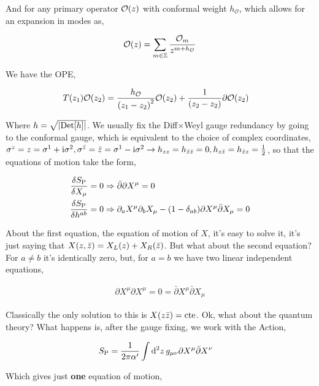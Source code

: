 And for any primary operator $\mathcal O\qty(z)$ with conformal weight $h_{\mathcal O}$, which allows for an expansion 
in modes as, 

\begin{align*}
    \mathcal O\qty(z)=\sum\limits_{m\in\mathbb Z}\frac{\mathcal O_m}{z^{m+h_{\mathcal O}}}
\end{align*}

We have the OPE,

\begin{align*}
    T\qty(z_1)\mathcal O\qty(z_2)&=\frac{h_{\mathcal O}}{\qty(z_1-z_2)^2}\mathcal O\qty(z_2)+\frac{1}{\qty(z_2-z_2)}\partial \mathcal O\qty(z_2)
\end{align*}

Where $h=\sqrt{\abs{\textup{Det} [h]}}$. We usually fix the Diff$\times$Weyl gauge redundancy by going to the conformal gauge, 
which is equivalent to the choice of complex coordinates, $\sigma^z=z=\sigma^1+\textnormal{i}\sigma^2,\sigma^{\bar z}=\bar z=\sigma^1-\textnormal{i}\sigma^2\rightarrow h_{zz}=h_{\bar z\bar z}=0, h_{z\bar z}=h_{\bar zz}=\frac12$, 
so that the equations of motion take the form,

\begin{align*}
    \fdv{S_{\textnormal P}}{X_\mu}&=0\Rightarrow \bar\partial\partial X^\mu=0\\
    \fdv{S_{\textnormal P}}{h^{ab}}&=0\Rightarrow \partial_aX^\mu\partial_bX_\mu-\qty(1-\delta_{ab})\partial X^\mu\bar\partial X_\mu=0
\end{align*}

About the first equation, the equation of motion of $X$, it's easy to solve it, it's just saying that $X\qty(z,\bar z)=X_L\qty(z)+X_R\qty(\bar z)$. 
But what about the second equation? For $a\neq b$ it's identically zero, but, for $a=b$ we have two linear independent equations,

\begin{align*}
    \partial X^\mu\partial X^\mu=0=\bar\partial X^\mu\bar\partial X_\mu
\end{align*}

Classically the only solution to this is $X\qty(z\bar z)=\textnormal{cte}$. Ok, what about the quantum theory? What happens is, after 
the gauge fixing, we work with the Action,

\begin{align*}
    S_{\textnormal P}&=\frac{1}{2\pi\alpha'}\int\dd[2]{z}g_{\mu\nu}\partial X^\mu\bar\partial X^\nu
\end{align*}

Which gives just \textbf{one} equation of motion,

